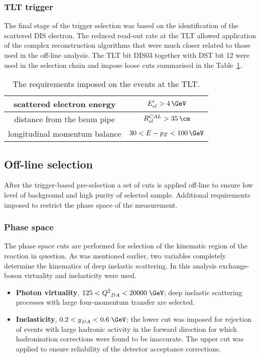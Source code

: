\subsubsection{TLT trigger}
\label{subsubsec:tltcuts}
The final stage of the trigger selection was based on the identification of the scattered DIS electron. The reduced read-out rate at the TLT allowed application of the complex reconstruction algorithms that were much closer related to those used in the off-line analysis. The TLT bit \textsf{DIS03} together with DST bit 12 were used in the selection chain and impose loose cuts summarised in the Table~\ref{tab:TLTDSTreq}.
\begin{table}
\centering
\begin{tabular}{|c|c|}
\hline scattered electron energy & $E'_{el}>4\,\GeV$ \\ 
\hline distance from the beam pipe  & $R_{el}^{CAL}>35\,\cm$ \\ 
\hline longitudinal momentum balance & $30<E-p_Z<100\,\GeV$\\
\hline 
\end{tabular} 
\caption{The requirements imposed on the events at the TLT.}
\label{tab:TLTDSTreq}
\end{table}

\subsection{Off-line selection}
\label{subsec:offlineselect}

After the trigger-based pre-selection a set of cuts is applied off-line to ensure low level of background and high purity of selected sample. Additional requirements imposed to restrict the phase space of the measurement. 

\subsubsection{Phase space}
\label{subsubsec:phasespace}
The phase space cuts are performed for selection of the kinematic region of the reaction in question. As was mentioned earlier, two variables completely determine the kinematics of deep inelastic scattering. In this analysis exchange-boson virtuality \qsq and inelasticity \y were used.
\begin{itemize}
	\item \textbf{Photon virtuality}, $125 < \qsq_{DA} < 20000\;\GeV$;  deep inelastic scattering processes with large four-momentum transfer are selected.
	\item \textbf{Inelasticity}, $0.2 < \y_{DA} < 0.6\;\GeV$; the lower cut was imposed for rejection of events with large hadronic activity in the forward direction for which hadronisation corrections were found to be inaccurate. The upper cut was applied to ensure reliability of the detector acceptance corrections.
\end{itemize}

